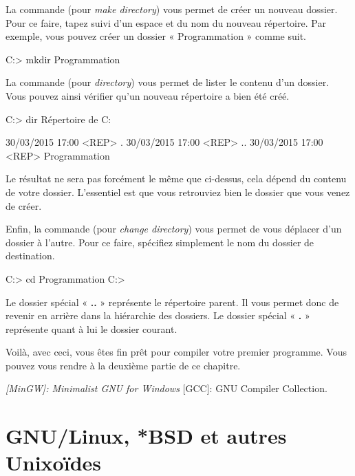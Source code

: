La commande  (pour \emph{make directory}) vous permet de
créer un nouveau dossier. Pour ce faire, tapez  suivi
d'un espace et du nom du nouveau répertoire. Par exemple, vous pouvez
créer un dossier « Programmation » comme suit.

\begin{bash}
  C:\Users\Utilisateur> mkdir Programmation
\end{bash}

La commande  (pour \emph{directory}) vous permet de lister
le contenu d'un dossier. Vous pouvez ainsi vérifier qu'un nouveau
répertoire a bien été créé.

\begin{bash}
  C:\Users\Utilisateur> dir Répertoire de C:\Users\Utilisateur

  30/03/2015 17:00 <REP> .  30/03/2015 17:00 <REP> ..  30/03/2015
  17:00 <REP> Programmation
\end{bash}

\begin{infobox}
  Le résultat ne sera pas forcément le même que ci-dessus, cela dépend
  du contenu de votre dossier. L'essentiel est que vous retrouviez
  bien le dossier que vous venez de créer.
\end{infobox}

Enfin, la commande  (pour \emph{change directory}) vous
permet de vous déplacer d'un dossier à l'autre. Pour ce faire,
spécifiez simplement le nom du dossier de destination.

\begin{bash}
  C:\Users\Utilisateur> cd Programmation
  C:\Users\Utilisateur\Programmation>
\end{bash}

\begin{infobox}
Le dossier spécial « \textbf{..} »
représente le répertoire parent. Il vous permet donc de revenir en
arrière dans la hiérarchie des dossiers. Le dossier spécial «
\textbf{.}  » représente quant à lui le dossier courant.
\end{infobox}

Voilà, avec ceci, vous êtes fin prêt pour compiler votre premier
programme. Vous pouvez vous rendre à la deuxième partie de ce
chapitre.

\emph{{[}MinGW{]}: Minimalist GNU for Windows }{[}GCC{]}: GNU Compiler
Collection.

\section{GNU/Linux, *BSD et autres Unixoïdes}

